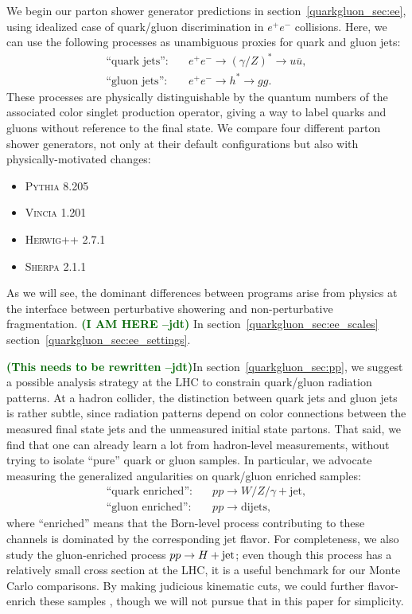 \documentclass[11pt]{cernrep}
\newcommand{\jdt}[1]{\textbf{\textcolor{darkgreen}{(#1 --jdt)}}}
\begin{document}
We begin our parton shower generator predictions in section~\ref{quarkgluon_sec:ee}, using idealized case of quark/gluon discrimination in $e^+e^-$ collisions.  Here, we can use the following processes as unambiguous proxies for quark and gluon jets:
\begin{align}
\text{``quark jets''}: \quad & e^+e^- \to (\gamma/Z)^* \to u \overline{u}, \\
\text{``gluon jets''}: \quad & e^+e^- \to h^* \to g g.
\end{align}
These processes are physically distinguishable by the quantum numbers of the associated color singlet production operator, giving a way to label quarks and gluons without reference to the final state.  We compare four different parton shower generators, not only at their default configurations but also with physically-motivated changes:
\begin{itemize}
\item \textsc{Pythia 8.205} \cite{}
\item \textsc{Vincia 1.201} \cite{}
\item \textsc{Herwig++ 2.7.1} \cite{}
\item \textsc{Sherpa 2.1.1} \cite{}
\end{itemize}
As we will see, the dominant differences between programs arise from physics at the interface between perturbative showering and non-perturbative fragmentation.   \jdt{I AM HERE}  In section~\ref{quarkgluon_sec:ee_scales} section~\ref{quarkgluon_sec:ee_settings}.

\jdt{This needs to be rewritten}In section~\ref{quarkgluon_sec:pp}, we suggest a possible analysis strategy at the LHC to constrain quark/gluon radiation patterns.  At a hadron collider, the distinction between quark jets and gluon jets is rather subtle, since radiation patterns depend on color connections between the measured final state jets and the unmeasured initial state partons.  That said, we find that one can already learn a lot from hadron-level measurements, without trying to isolate ``pure'' quark or gluon samples.  In particular, we advocate measuring the generalized angularities on quark/gluon enriched samples:
\begin{align}
\text{``quark enriched''}: \quad & pp \to W/Z/\gamma + \text{jet}, \\
\text{``gluon enriched''}: \quad & pp \to \text{dijets},
\end{align}
where ``enriched'' means that the Born-level process contributing to these channels is dominated by the corresponding jet flavor.  For completeness, we also study the gluon-enriched process $pp \to H + \rm{jet}$; even though this process has a relatively small cross section at the LHC, it is a useful benchmark for our Monte Carlo comparisons.  By making judicious kinematic cuts, we could further flavor-enrich these samples \cite{}, though we will not pursue that in this paper for simplicity.
\end{document}
